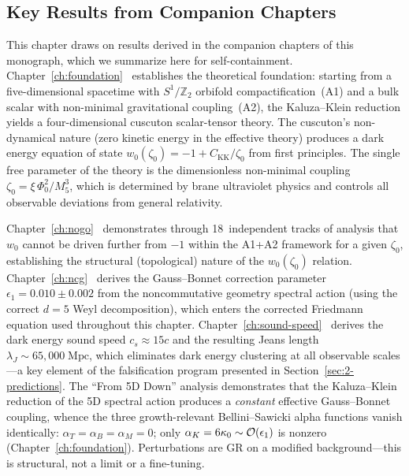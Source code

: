 \subsection{Key Results from Companion Chapters}
\label{sec:2-companion}

This chapter draws on results derived in the companion chapters of this monograph, which we summarize here for self-containment. Chapter~\ref{ch:foundation}~\cite{ch2:PaperI} establishes the theoretical foundation: starting from a five-dimensional spacetime with $S^1/\mathbb{Z}_2$ orbifold compactification~(A1) and a bulk scalar with non-minimal gravitational coupling~(A2), the Kaluza--Klein reduction yields a four-dimensional cuscuton scalar-tensor theory. The cuscuton's non-dynamical nature (zero kinetic energy in the effective theory) produces a dark energy equation of state $w_0(\zeta_0) = -1 + C_\mathrm{KK}/\zeta_0$ from first principles. The single free parameter of the theory is the dimensionless non-minimal coupling $\zeta_0 = \xi\,\Phi_0^2/M_5^3$, which is determined by brane ultraviolet physics and controls all observable deviations from general relativity.

Chapter~\ref{ch:nogo}~\cite{ch2:PaperIII} demonstrates through 18~independent tracks of analysis that $w_0$ cannot be driven further from $-1$ within the A1+A2 framework for a given $\zeta_0$, establishing the structural (topological) nature of the $w_0(\zeta_0)$ relation. Chapter~\ref{ch:ncg}~\cite{ch2:PaperIV} derives the Gauss--Bonnet correction parameter $\epsilon_1 = 0.010 \pm 0.002$ from the noncommutative geometry spectral action (using the correct $d = 5$ Weyl decomposition), which enters the corrected Friedmann equation used throughout this chapter. Chapter~\ref{ch:sound-speed}~\cite{ch2:PaperV} derives the dark energy sound speed $c_s \approx 15c$ and the resulting Jeans length $\lambda_J \sim 65{,}000\;\mathrm{Mpc}$, which eliminates dark energy clustering at all observable scales---a key element of the falsification program presented in Section~\ref{sec:2-predictions}. The ``From 5D Down'' analysis demonstrates that the Kaluza--Klein reduction of the 5D spectral action produces a \emph{constant} effective Gauss--Bonnet coupling, whence the three growth-relevant Bellini--Sawicki alpha functions vanish identically: $\alpha_T = \alpha_B = \alpha_M = 0$; only $\alpha_K = 6\kappa_0 \sim \mathcal{O}\!\left(\epsilon_1\right)$ is nonzero (Chapter~\ref{ch:foundation}). Perturbations are GR on a modified background---this is structural, not a limit or a fine-tuning.

